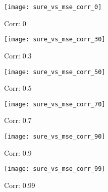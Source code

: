 \begin{figure}[h]
    \centering
    \texttt{[image: sure\_vs\_mse\_corr\_0]}
    \caption{Corr: 0}
    \label{fig:sure_vs_mse_corr_0}
\end{figure}

\begin{figure}[h]
    \centering
    \texttt{[image: sure\_vs\_mse\_corr\_30]}
    \caption{Corr: 0.3}
    \label{fig:sure_vs_mse_corr_30}
\end{figure}

\begin{figure}[h]
    \centering
    \texttt{[image: sure\_vs\_mse\_corr\_50]}
    \caption{Corr: 0.5}
    \label{fig:sure_vs_mse_corr_50}
\end{figure}

\begin{figure}[h]
    \centering
    \texttt{[image: sure\_vs\_mse\_corr\_70]}
    \caption{Corr: 0.7}
    \label{fig:sure_vs_mse_corr_70}
\end{figure}

\begin{figure}[h]
    \centering
    \texttt{[image: sure\_vs\_mse\_corr\_90]}
    \caption{Corr: 0.9}
    \label{fig:sure_vs_mse_corr_90}
\end{figure}

\begin{figure}[h]
    \centering
    \texttt{[image: sure\_vs\_mse\_corr\_99]}
    \caption{Corr: 0.99}
    \label{fig:sure_vs_mse_corr_99}
\end{figure}
